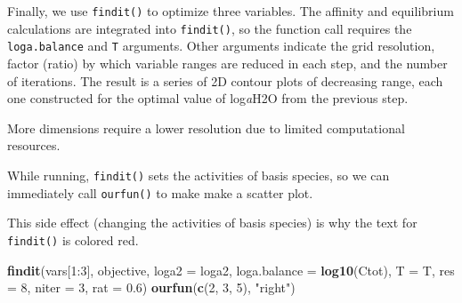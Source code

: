 \documentclass[]{tufte-handout}
\newenvironment{Shaded}{}{}
\newcommand{\KeywordTok}[1]{\textcolor[rgb]{0.00,0.44,0.13}{\textbf{#1}}}
\newcommand{\DataTypeTok}[1]{\textcolor[rgb]{0.56,0.13,0.00}{#1}}
\newcommand{\DecValTok}[1]{\textcolor[rgb]{0.25,0.63,0.44}{#1}}
\newcommand{\FloatTok}[1]{\textcolor[rgb]{0.25,0.63,0.44}{#1}}
\newcommand{\StringTok}[1]{\textcolor[rgb]{0.25,0.44,0.63}{#1}}
\newcommand{\OperatorTok}[1]{\textcolor[rgb]{0.40,0.40,0.40}{#1}}
\newcommand{\NormalTok}[1]{#1}
\begin{document}
\begin{Shaded}
\end{Shaded}

Finally, we use {\texttt{findit()}} to optimize three variables. The
affinity and equilibrium calculations are integrated into
{\texttt{findit()}}, so the function call requires the
\texttt{loga.balance} and \texttt{T} arguments. Other arguments indicate
the grid resolution, factor (ratio) by which variable ranges are reduced
in each step, and the number of iterations. The result is a series of 2D
contour plots of decreasing range, each one constructed for the optimal
value of log\emph{a}H2O from the previous step.

\begin{marginfigure}
More dimensions require a lower resolution due to limited computational
resources.
\end{marginfigure}

While running, {\texttt{findit()}} sets the activities of basis species,
so we can immediately call \texttt{ourfun()} to make make a scatter
plot.

\begin{marginfigure}
This side effect (changing the activities of basis species) is why the
text for {\texttt{findit()}} is colored red.
\end{marginfigure}

\begin{Shaded}
\begin{Highlighting}[]
\KeywordTok{findit}\NormalTok{(vars[}\DecValTok{1}\OperatorTok{:}\DecValTok{3}\NormalTok{], objective, }\DataTypeTok{loga2 =}\NormalTok{ loga2, }\DataTypeTok{loga.balance =} \KeywordTok{log10}\NormalTok{(Ctot),}
       \DataTypeTok{T =}\NormalTok{ T, }\DataTypeTok{res =} \DecValTok{8}\NormalTok{, }\DataTypeTok{niter =} \DecValTok{3}\NormalTok{, }\DataTypeTok{rat =} \FloatTok{0.6}\NormalTok{)}
\KeywordTok{ourfun}\NormalTok{(}\KeywordTok{c}\NormalTok{(}\DecValTok{2}\NormalTok{, }\DecValTok{3}\NormalTok{, }\DecValTok{5}\NormalTok{), }\StringTok{"right"}\NormalTok{)}
\end{Highlighting}
\end{Shaded}
\end{document}
